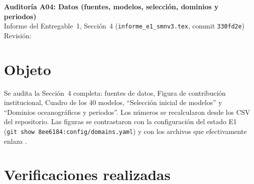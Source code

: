 \newcommand{\auditoriaid}{A04 -- Datos}

\graphicspath{{../}}


\begin{center}
{\Large\bfseries Auditoría A04: Datos (fuentes, modelos, selección, dominios y periodos)}\\[0.4em]
{\normalsize Informe del Entregable~1, Sección~4 (\texttt{informe\_e1\_smnv3.tex}, commit \texttt{330fd2e})}\\[0.2em]
{\small Revisión: \fechaentrega}
\end{center}

\section{Objeto}

Se audita la Sección~4 completa: fuentes de datos, Figura de contribución institucional, Cuadro de los 40 modelos, ``Selección inicial de modelos'' y ``Dominios oceanográficos y periodos''. Los números se recalcularon desde los CSV del repositorio. Las figuras se contrastaron con la configuración del estado E1 (\texttt{git show 8ee6184:config/domains.yaml}) y con los archivos que efectivamente enlaza .


\section{Verificaciones realizadas}


